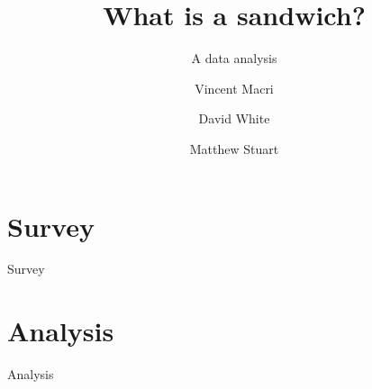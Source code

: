 

\title{What is a sandwich?}
\subtitle{A data analysis}
\author{Vincent Macri \and David White \and Matthew Stuart}


	\maketitle
	
	\tableofcontents
	\clearpage
	\part{Survey}\label{part:survey}
		{Survey}
	\part{Analysis}\label{part:analysis}
		{Analysis}
	\nocite{*}
	\printbibliography

